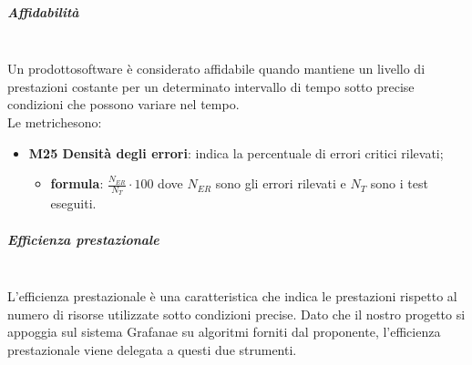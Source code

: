 		\subparagraph{Affidabilità} \mbox{}\\[1mm]
		Un prodotto\glosp software è considerato affidabile quando mantiene un livello di prestazioni costante per un determinato intervallo di tempo sotto precise condizioni che possono variare nel tempo.\\
		Le metriche\glosp sono:
		\begin{itemize}
			\item \textbf{M25 Densità degli errori}: indica la percentuale di errori critici rilevati; 
			\begin{itemize}
				\item[] \textbf{formula}: $\frac{N_{ER}}{N_{T}}\cdot100$ dove $N_{ER}$ sono gli errori rilevati e $N_T$ sono i test eseguiti.
			\end{itemize}
		\end{itemize}
	
		\subparagraph{Efficienza prestazionale} \mbox{}\\
		L'efficienza prestazionale è una caratteristica che indica le prestazioni rispetto al numero di risorse utilizzate sotto condizioni precise. Dato che il nostro progetto si appoggia sul sistema Grafana\glosp e su algoritmi forniti dal proponente, l'efficienza prestazionale viene delegata a questi due strumenti.
			
